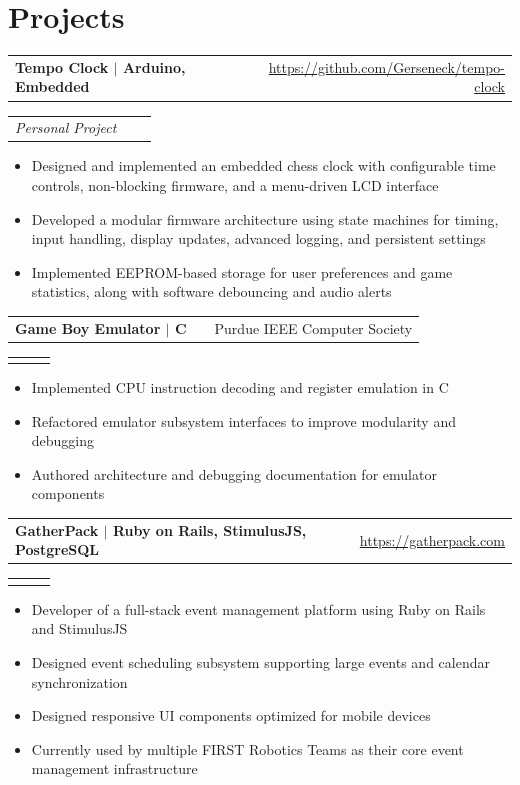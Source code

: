 \documentclass[letter, 10.5pt]{article}
\makeatletter
\newenvironment{job}[2]{%
    \begin{tabularx}{\linewidth}{@{}l X r@{}}%
        \textbf{#1} & \hfill & #2 \\%
    \end{tabularx}%
}{}
\newcommand{\jobdescription}[2]{%
    \begin{tabularx}{\linewidth}{@{}l X r@{}}%
        \footnotesize{\textit{#1}} &%
        \hfill &%
        \ifstrempty{#2}{}{\footnotesize{\textit{#2}}} \\%
    \end{tabularx}%
}
\makeatother
\begin{document}
\section{Projects}

\begin{job}{Tempo Clock \( \vert \) Arduino, Embedded}{\href{https://github.com/Gerseneck/tempo-clock}{https://github.com/Gerseneck/tempo-clock}}
    \vspace{-0.5em}
    \jobdescription{Personal Project}{June 2026 - August 2026}
    \begin{itemize}
        \item Designed and implemented an embedded chess clock with configurable time controls, non-blocking firmware, and a menu-driven LCD interface
        \item Developed a modular firmware architecture using state machines for timing, input handling, display updates, advanced logging, and persistent settings
        \item Implemented EEPROM-based storage for user preferences and game statistics, along with software debouncing and audio alerts
    \end{itemize}
\end{job}

\begin{job}{Game Boy Emulator \( \vert \) C}{Purdue IEEE Computer Society}
    \vspace{-0.5em}
    \jobdescription{}{January 2026 - Present}
    \begin{itemize}
        \item Implemented CPU instruction decoding and register emulation in C
        \item Refactored emulator subsystem interfaces to improve modularity and debugging
        \item Authored architecture and debugging documentation for emulator components
    \end{itemize}
\end{job}

\begin{job}{GatherPack \( \vert \) Ruby on Rails, StimulusJS, PostgreSQL}{\href{https://gatherpack.com}{https://gatherpack.com}}
    \vspace{-0.5em}
    \jobdescription{}{May 2024 - Present}
    \begin{itemize}
        \item Developer of a full-stack event management platform using Ruby on Rails and StimulusJS
        \item Designed event scheduling subsystem supporting large events and calendar synchronization
        \item Designed responsive UI components optimized for mobile devices
        \item Currently used by multiple FIRST Robotics Teams as their core event management infrastructure
    \end{itemize}
\end{job}
\end{document}

